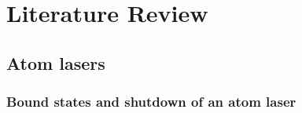 \chapter{Literature Review}
\label{LiteratureReview}
\graphicspath{{Figures/LiteratureReview/}{Figures/Common/}}

\section{Atom lasers}
\subsection{Bound states and shutdown of an atom laser}